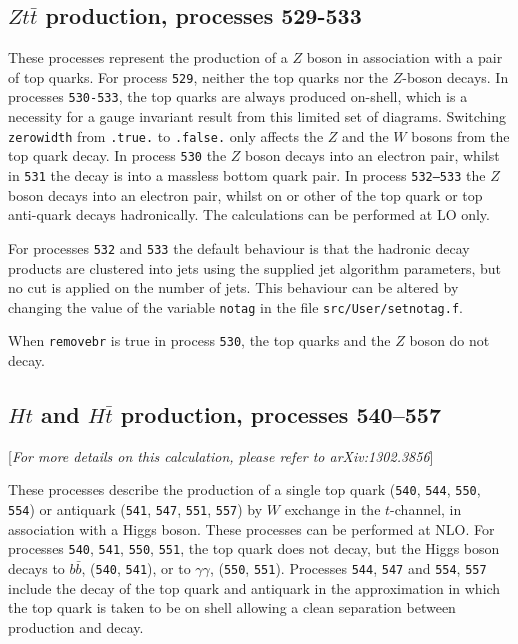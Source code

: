 \documentclass[12pt]{article}
\begin{document}
\subsection{$Zt{\bar t}$ production, processes 529-533}
\label{subsec:ztt}

These processes represent the production of a $Z$ boson in association
with a pair of top quarks.
For process {\tt 529}, neither the top quarks nor the $Z$-boson
decays. 
In processes {\tt 530-533}, the top quarks are always
produced on-shell, which is a necessity for a gauge invariant result
from this limited set of diagrams.
Switching {\tt zerowidth} from {\tt .true.} to {\tt .false.} only affects
the $Z$ and the $W$ bosons from the top quark decay.
In process {\tt 530} the $Z$ boson decays into an electron pair, whilst
in {\tt 531} the decay is into a massless bottom quark pair.
In process {\tt 532--533} the $Z$ boson decays into an electron pair, whilst
on or other of the top quark or top anti-quark decays hadronically.
The calculations can be performed at LO only.

For processes {\tt 532} and {\tt 533} the default behaviour is that the hadronic decay products
are clustered into jets using the supplied jet
algorithm parameters, but no cut is applied on the number of jets.
This behaviour can be altered by changing the value of the
variable {\tt notag} in the file {\tt src/User/setnotag.f}.

When {\tt removebr} is true in process {\tt 530}, the top quarks and the $Z$ boson do not decay.

\subsection{$Ht$ and $H\bar{t}$ production, processes 540--557}
[{\it For more details on this calculation, please refer to arXiv:1302.3856}]

\label{subsec:Ht}
These processes describe the production of a single top quark ({\tt 540}, {\tt 544}, {\tt 550},
{\tt 554}) or antiquark ({\tt 541}, {\tt 547}, {\tt 551}, {\tt 557}) by $W$ exchange in the
$t$-channel, in association with a Higgs boson. These processes can be performed at NLO.
For processes {\tt 540}, {\tt 541}, {\tt 550},
{\tt 551}, the top quark does not decay, but the
Higgs boson decays to $b\bar{b}$, ({\tt 540}, {\tt 541}), or to $\gamma \gamma$, ({\tt 550}, {\tt 551}).
Processes {\tt 544}, {\tt 547} and {\tt 554}, {\tt 557} include the decay of the top quark and antiquark
in the approximation in which the top quark is taken to be on shell allowing a clean separation
between production and decay. 
\end{document}
